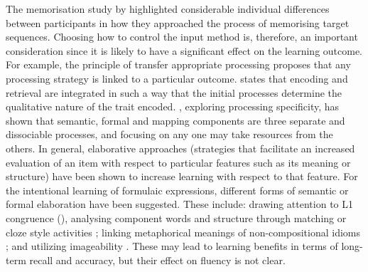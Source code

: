 \documentclass[output=paper]{langscibook}
\begin{document}
The memorisation study by \citet{FitzpatrickWray2006} highlighted considerable individual differences between participants in how they approached the process of memorising target sequences. Choosing how to control the input method is, therefore, an important consideration since it is likely to have a significant effect on the learning outcome. For example, the principle of transfer appropriate processing \citep{RoedigerEtAl2002} proposes that any processing strategy is linked to a particular outcome. \citet{Craik2002} states that encoding and retrieval are integrated in such a way that the initial processes determine the qualitative nature of the trait encoded. \citet{Barcroft2002, Barcroft2006}, exploring processing specificity, has shown that semantic, formal and mapping components are three separate and dissociable processes, and focusing on any one may take resources from the others. In general, elaborative approaches (strategies that facilitate an increased evaluation of an item with respect to particular features such as its meaning or structure) have been shown to increase learning with respect to that feature. For the intentional learning of formulaic expressions, different forms of semantic or formal elaboration have been suggested. These include: drawing attention to L1 congruence (\citealt{ConklinCarrol2019}), analysing component words and structure through matching or cloze style activities \citep{BoersEtAl2014}; linking metaphorical meanings of non-compositional idioms \citep{BoersEtAl2007}; and utilizing imageability \citep{SteinelEtAl2007}. These may lead to learning benefits in terms of long-term recall and accuracy, but their effect on fluency is not clear.
\end{document}
